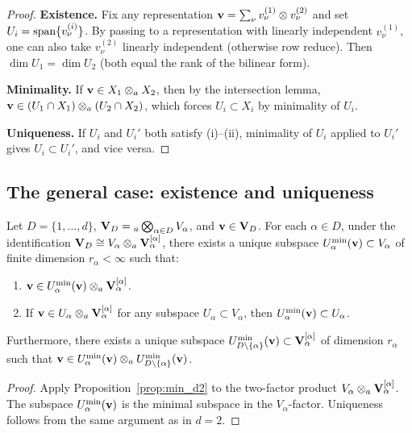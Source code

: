 \begin{proof}
\textbf{Existence.} Fix any representation $\mathbf{v} = \sum_\nu v^{(1)}_\nu
\otimes v^{(2)}_\nu$ and set $U_i = \mathrm{span}\{v^{(i)}_\nu\}$. By passing
to a representation with linearly independent $v^{(1)}_\nu$, one can also
take $v^{(2)}_\nu$ linearly independent (otherwise row reduce).
Then $\dim U_1 = \dim U_2$ (both equal the rank of the bilinear form).

\textbf{Minimality.} If $\mathbf{v} \in X_1 \otimes_a X_2$, then by the
intersection lemma, $\mathbf{v} \in (U_1 \cap X_1) \otimes_a (U_2 \cap X_2)$,
which forces $U_i \subset X_i$ by minimality of $U_i$.

\textbf{Uniqueness.} If $U_i$ and $U_i'$ both satisfy (i)--(ii),
minimality of $U_i$ applied to $U_i'$ gives $U_i \subset U_i'$,
and vice versa.
\end{proof}

\subsection*{The general case: existence and uniqueness}

\begin{theorem}
\label{thm:min_existence}
Let $D = \{1, \ldots, d\}$, $\mathbf{V}_D = {}_a\bigotimes_{\alpha \in D}
V_\alpha$, and $\mathbf{v} \in \mathbf{V}_D$. For each $\alpha \in D$, under the
identification $\mathbf{V}_D \cong V_\alpha \otimes_a \mathbf{V}_\alpha^{[\alpha]}$,
there exists a unique subspace $U^{\min}_{\alpha}(\mathbf{v}) \subset V_\alpha$
of finite dimension $r_\alpha < \infty$ such that:
\begin{enumerate}
\item[\textup{(a)}] $\mathbf{v} \in U^{\min}_{\alpha}(\mathbf{v}) \otimes_a
    \mathbf{V}_\alpha^{[\alpha]}$.
\item[\textup{(b)}] If $\mathbf{v} \in U_\alpha \otimes_a \mathbf{V}_\alpha^{[\alpha]}$
    for any subspace $U_\alpha \subset V_\alpha$, then
    $U^{\min}_{\alpha}(\mathbf{v}) \subset U_\alpha$.
\end{enumerate}
Furthermore, there exists a unique subspace
$U^{\min}_{D\setminus\{\alpha\}}(\mathbf{v}) \subset \mathbf{V}_\alpha^{[\alpha]}$
of dimension $r_\alpha$ such that
$\mathbf{v} \in U^{\min}_{\alpha}(\mathbf{v}) \otimes_a U^{\min}_{D\setminus\{\alpha\}}(\mathbf{v})$.
\end{theorem}

\begin{proof}
Apply Proposition~\ref{prop:min_d2} to the two-factor product
$V_\alpha \otimes_a \mathbf{V}_\alpha^{[\alpha]}$. The subspace $U^{\min}_{\alpha}(\mathbf{v})$
is the minimal subspace in the $V_\alpha$-factor. Uniqueness follows
from the same argument as in $d=2$.
\end{proof}

